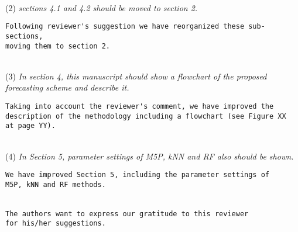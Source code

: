 \documentclass[preprint]{elsarticle}
\begin{document}
~\\
\noindent (2) \emph{sections 4.1 and 4.2 should be moved to section 2. } 

\begin{verbatim}
Following reviewer's suggestion we have reorganized these sub-sections, 
moving them to section 2.
\end{verbatim}


~\\
\noindent (3) \emph{In section 4, this manuscript should show a flowchart of the proposed forecasting scheme and describe it. } 

\begin{verbatim}
Taking into account the reviewer's comment, we have improved the 
description of the methodology including a flowchart (see Figure XX 
at page YY).
\end{verbatim}


~\\
\noindent (4) \emph{In Section 5, parameter settings of 
M5P, kNN and RF also should be shown. } 

\begin{verbatim}
We have improved Section 5, including the parameter settings of 
M5P, kNN and RF methods.


The authors want to express our gratitude to this reviewer 
for his/her suggestions.
\end{verbatim}
\end{document}
